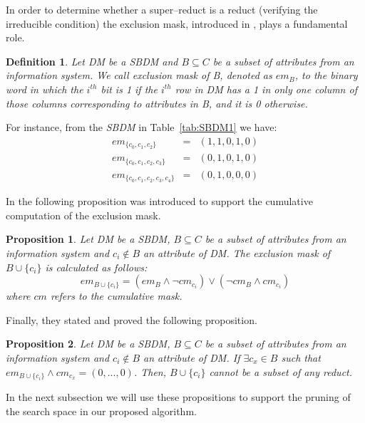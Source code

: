 \documentclass[number,preprint,review,12pt]{elsarticle}
\newtheorem{proposition}{Proposition}
\newtheorem{definition}{Definition}
\begin{document}
	In order to determine whether a super--reduct is a reduct (verifying the irreducible condition) the
	exclusion mask, introduced in \cite{Lias09}, plays a fundamental role. 
	
	\begin{definition}\label{def:exclusion}
		Let DM be a SBDM and $B \subseteq C$ be a subset of attributes from an information system. We call exclusion mask of B, denoted as $em_B$, to the binary word in which the $i^{\mathit{th}}$ bit is 1 if the $i^{\mathit{th}}$ row in DM has a 1 in only one column of those columns corresponding to attributes in B, and it is 0 otherwise.
	\end{definition}
	
	For instance, from the \textit{SBDM} in Table~\ref{tab:SBDM1} we have:
	$$\begin{array}{lcc}
	  em_{\lbrace c_0,c_1,c_2\rbrace}         &=& (1,1,0,1,0)\\
	  em_{\lbrace c_0,c_1,c_2,c_3\rbrace}     &=& (0,1,0,1,0)\\
	  em_{\lbrace c_0,c_1,c_2,c_3,c_4\rbrace} &=& (0,1,0,0,0)
	\end{array}$$
	
	In \cite{Lias13} the following proposition was introduced to support the cumulative computation of the exclusion mask.
	
	\begin{proposition}\label{prop:cumul} 
		Let DM be a SBDM, $B \subseteq C$ be a subset of attributes from an information system and $c_i \notin B$ an attribute of DM. The exclusion mask of $B \cup \lbrace c_i\rbrace$ is calculated as follows: $$em_{B \cup \lbrace c_i\rbrace}=(em_B \wedge \neg cm_{c_i}) \vee (\neg cm_B \wedge cm_{c_i})$$	where $cm$ refers to the cumulative mask.
	\end{proposition}
	
	Finally, they stated and proved the following proposition.
	
	\begin{proposition}\label{prop:exclude} 
		Let DM be a SBDM, $B \subseteq C$ be a subset of attributes from an information system and $c_i \notin B$ an attribute of DM. If $\exists c_x \in B$ such that $em_{B \cup \lbrace c_i\rbrace} \wedge cm_{c_x}=(0,...,0)$. Then, $B \cup \lbrace c_i\rbrace$ cannot be a subset of any reduct.
	\end{proposition}
	
	In the next subsection we will use these propositions to support the pruning of the search space in our proposed algorithm.
\end{document}
